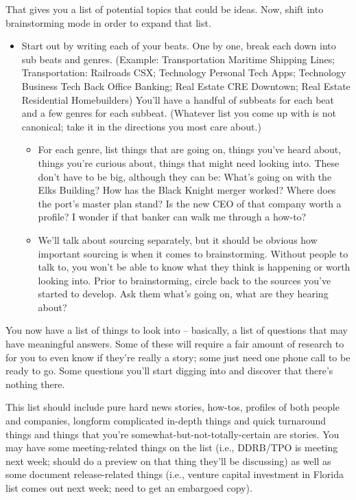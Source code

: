 \documentclass[
  11pt,
  american,
  letterpaperpaper,
  extrafontsizes,onecolumn,openright
  ]{memoir}
\providecommand{\tightlist}{%
  \setlength{\itemsep}{0pt}\setlength{\parskip}{0pt}}
\begin{document}
That gives you a list of potential topics that could be ideas. Now, shift into brainstorming mode in order to expand that list.

\begin{itemize}
\tightlist
\item
  Start out by writing each of your beats. One by one, break each down into sub beats and genres. (Example: Transportation \textbar{} Maritime \textbar{} Shipping Lines; Transportation: Railroads \textbar{} CSX; Technology \textbar{} Personal Tech \textbar{} Apps; Technology \textbar{} Business Tech \textbar{} Back Office Banking; Real Estate \textbar{} CRE \textbar{} Downtown; Real Estate \textbar{} Residential \textbar{} Homebuilders) You'll have a handful of subbeats for each beat and a few genres for each subbeat. (Whatever list you come up with is not canonical; take it in the directions you most care about.)

  \begin{itemize}
  \tightlist
  \item
    For each genre, list things that are going on, things you've heard about, things you're curious about, things that might need looking into. These don't have to be big, although they can be: What's going on with the Elks Building? How has the Black Knight merger worked? Where does the port's master plan stand? Is the new CEO of that company worth a profile? I wonder if that banker can walk me through a how-to?
  \item
    We'll talk about sourcing separately, but it should be obvious how important sourcing is when it comes to brainstorming. Without people to talk to, you won't be able to know what they think is happening or worth looking into. Prior to brainstorming, circle back to the sources you've started to develop. Ask them what's going on, what are they hearing about?
  \end{itemize}
\end{itemize}

You now have a list of things to look into -- basically, a list of questions that may have meaningful answers. Some of these will require a fair amount of research to for you to even know if they're really a story; some just need one phone call to be ready to go. Some questions you'll start digging into and discover that there's nothing there.

This list should include pure hard news stories, how-tos, profiles of both people and companies, longform complicated in-depth things and quick turnaround things and things that you're somewhat-but-not-totally-certain are stories. You may have some meeting-related things on the list (i.e., DDRB/TPO is meeting next week; should do a preview on that thing they'll be discussing) as well as some document release-related things (i.e., venture capital investment in Florida list comes out next week; need to get an embargoed copy).
\end{document}
